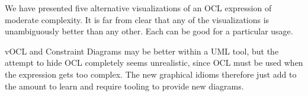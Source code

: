 \documentclass{llncs}
\begin{document}
We have presented five alternative visualizations of an OCL expression of moderate complexity. It is far from clear that any of the visualizations is unambiguously better than any other. Each can be good for a particular usage.

vOCL and Constraint Diagrams may be better within a UML tool, but the attempt to hide OCL completely seems unrealistic, since OCL must be used when the expression gets too complex. The new graphical idioms therefore just add to the amount to learn and require tooling to provide new diagrams. 

%
%
\begin{thebibliography}{}
%








\end{thebibliography}
\end{document}

